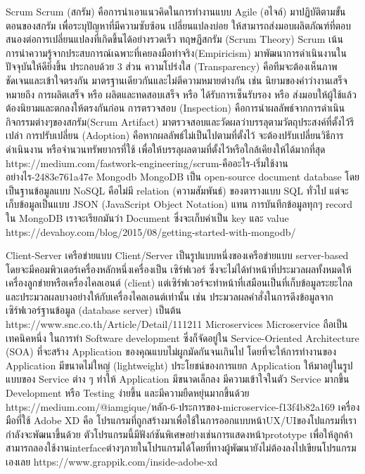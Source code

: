   
  
  Scrum
    Scrum (สกรัม) คือการนำเอาแนวคิดในการทำงานแบบ Agile (อไจล์) มาปฏิบัติตามขั้นตอนของสกรัม เพื่อระบุปัญหาที่มีความซับซ้อน เปลี่ยนแปลงบ่อย ให้สามารถส่งมอบผลิตภัณฑ์ที่ตอบสนองต่อการเปลี่ยนแปลงที่เกิดขึ้นได้อย่างรวดเร็ว
  ทฤษฏีสกรัม (Scrum Theory)
  Scrum เน้นการนำความรู้จากประสบการณ์เฉพาะที่เคยลงมือทำจริง(Empiricism) มาพัฒนาการดำเนินงานในปัจจุบันให้ดียิ่งขึ้น ประกอบด้วย 3 ส่วน
  ความโปร่งใส (Transparency) คือทีมจะต้องเห็นภาพชัดเจนและเข้าใจตรงกัน มาตรฐานเดียวกันและไม่ตีความหมายต่างกัน เช่น นิยามของคำว่างานเสร็จ หมายถึง การผลิตเสร็จ หรือ ผลิตและทดสอบเสร็จ หรือ ได้รับการเซ็นรับรอง หรือ ส่งมอบให้ผู้ใช้แล้ว ต้องนิยามและตกลงให้ตรงกันก่อน
  การตรวจสอบ (Inspection) คือการนำผลลัพธ์จากการดำเนินกิจกรรมต่างๆของสกรัม(Scrum Artifact) มาตรวจสอบและวัดผลว่าบรรลุตามวัตถุประสงค์ที่ตั้งไว้รึเปล่า
  การปรับเปลี่ยน (Adoption) คือหากผลลัพธ์ไม่เป็นไปตามที่ตั้งไว้ จะต้องปรับเปลี่ยนวิธีการดำเนินงาน หรือจำนวนทรัพยากรที่ใช้ เพื่อให้บรรลุผลตามที่ตั้งไว้หรือใกล้เคียงให้ได้มากที่สุด
  https://medium.com/fastwork-engineering/scrum-คืออะไร-เริ่มใช้งานอย่างไร-2483e761a47e
  Mongodb
  MongoDB เป็น open-source document database โดยเป็นฐานข้อมูลแบบ NoSQL คือไม่มี relation (ความสัมพันธ์) ของตารางแบบ SQL ทั่วไป แต่จะเก็บข้อมูลเป็นแบบ JSON (JavaScript Object Notation) แทน การบันทึกข้อมูลทุกๆ record ใน MongoDB เราจะเรียกมันว่า Document ซึ่งจะเก็บค่าเป็น key และ value 
  https://devahoy.com/blog/2015/08/getting-started-with-mongodb/
  
  Client-Server
  เครือข่ายแบบ Client/Server เป็นรูปแบบหนึ่งของเครือข่ายแบบ server-based โดยจะมีคอมพิวเตอร์เครื่องหลักหนึ่งเครื่องเป็น เซิร์ฟเวอร์ ซึ่งจะไม่ได้ทำหน้าที่ประมวลผลทั้งหมดให้เครื่องลูกข่ายหรือเครื่องไคลเอนต์ (client) แต่เซิร์ฟเวอร์จะทำหน้าที่เสมือนเป็นที่เก็บข้อมูลระยะไกล และประมวลผลบางอย่างให้กับเครื่องไคลเอนต์เท่านั้น เช่น ประมวลผลคำสั่งในการดึงข้อมูลจากเซิร์ฟเวอร์ฐานข้อมูล (database server) เป็นต้น
  https://www.snc.co.th/Article/Detail/111211
  Microservices
  Microservice ถือเป็นเทคนิคหนึ่ง ในการทำ Software development ซึ่งก็จัดอยู่ใน Service-Oriented Architecture (SOA) ที่จะสร้าง Application ของคุณแบบไม่ผูกมัดกันจนเกินไป โดยที่จะให้การทำงานของ Application มีขนาดไม่ใหญ่ (lightweight)
  ประโยชน์ของการแยก Application ให้มาอยู่ในรูปแบบของ Service ต่าง ๆ ทำให้ Application มีขนาดเล็กลง มีความเข้าใจในตัว Service มากขึ้น Development หรือ Testing ง่ายขึ้น และมีความยืดหยุ่นมากขึ้นด้วย
  https://medium.com/@iamgique/หลัก-6-ประการของ-microservice-f13f4b82a169
  เครื่องมือที่ใช้
  Adobe XD
  คือ โปรแกรมที่ถูกสร้างมาเพื่อใช้ในการออกแบบหน้าUX/UIของโปแกรมที่เรากำลังจะพัฒนาขึ้นด้วย ตัวโปรแกรมนี้มีฟังก์ชันพิเศษอย่างเช่นการแสดงหน้าprototype เพื่อให้ลูกค้าสามารถลองใช้งานinterfaceต่างๆภายในโปรแกรมได้โดยที่ทางผู้พัฒนายังไม่ต้องลงไปเขียนโปรแกรมเองเลย
  https://www.grappik.com/inside-adobe-xd
  

